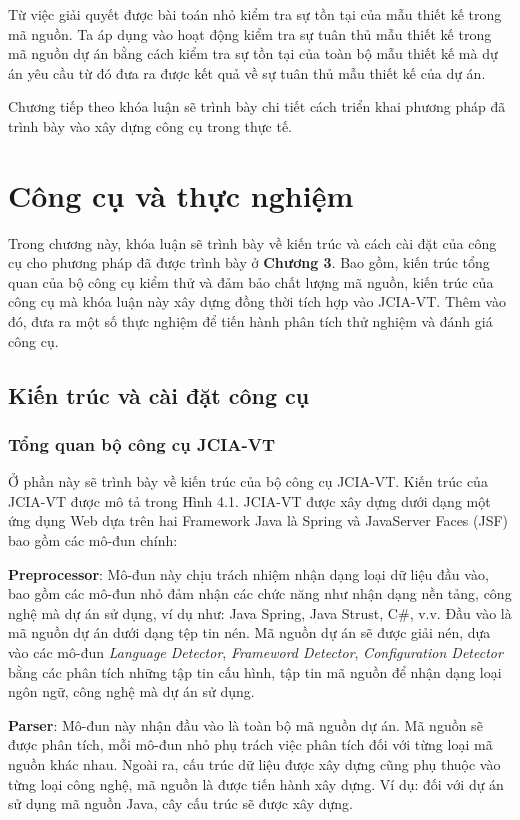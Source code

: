 \documentclass[12pt]{report}
\begin{document}
\noindent Từ việc giải quyết được bài toán nhỏ kiểm tra sự tồn tại của mẫu thiết kế trong mã nguồn. Ta áp dụng vào hoạt động kiểm tra sự tuân thủ mẫu thiết kế trong mã nguồn dự án bằng cách kiểm tra sự tồn tại của toàn bộ mẫu thiết kế mà dự án yêu cầu từ đó đưa ra được kết quả về sự tuân thủ mẫu thiết kế của dự án. 

\noindent Chương tiếp theo khóa luận sẽ trình bày chi tiết cách triển khai phương pháp đã trình bày vào xây dựng công cụ trong thực tế.
\chapter{Công cụ và thực nghiệm}
Trong chương này, khóa luận sẽ trình bày về kiến trúc và cách cài đặt của công cụ cho phương pháp đã được trình bày ở \textbf{Chương 3}. Bao gồm, kiến trúc tổng quan của bộ công cụ kiểm thử và đảm bảo chất lượng mã nguồn, kiến trúc của công cụ mà khóa luận này xây dựng đồng thời tích hợp vào JCIA-VT. Thêm vào đó, đưa ra một số thực nghiệm để tiến hành phân tích thử nghiệm và đánh giá công cụ.

\newpage
\section{Kiến trúc và cài đặt công cụ}
\subsection{Tổng quan bộ công cụ JCIA-VT}
Ở phần này sẽ trình bày về kiến trúc của bộ công cụ JCIA-VT. Kiến trúc của JCIA-VT được mô tả trong Hình 4.1. JCIA-VT được xây dựng dưới dạng một ứng dụng Web dựa trên hai Framework Java là Spring và JavaServer Faces (JSF) bao gồm các mô-đun chính:

\noindent \textbf{Preprocessor}: Mô-đun này chịu trách nhiệm nhận dạng loại dữ liệu đầu vào, bao gồm các mô-đun nhỏ đảm nhận các chức năng như nhận dạng nền tảng, công nghệ mà dự án sử dụng, ví dụ như: Java Spring, Java Strust, C$\#$, v.v. Đầu vào là mã nguồn dự án dưới dạng tệp tin nén. Mã nguồn dự án sẽ được giải nén, dựa vào các mô-đun \textit{Language Detector}, \textit{Frameword Detector}, \textit{Configuration Detector} bằng các phân tích những tập tin cấu hình, tập tin mã nguồn để nhận dạng loại ngôn ngữ, công nghệ mà dự án sử dụng.

\noindent \textbf{Parser}: Mô-đun này nhận đầu vào là toàn bộ mã nguồn dự án. Mã nguồn sẽ được phân tích, mỗi mô-đun nhỏ phụ trách việc phân tích đối với từng loại mã nguồn khác nhau. Ngoài ra, cấu trúc dữ liệu được xây dựng cũng phụ thuộc vào từng loại công nghệ, mã nguồn là được tiến hành xây dựng. Ví dụ: đối với dự án sử dụng mã nguồn Java, cây cấu trúc sẽ được xây dựng.
\end{document}
